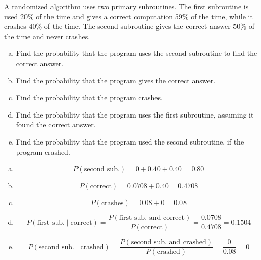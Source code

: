 \documentclass[11pt,letterpaper]{article}
\begin{document}
\newpage



 A randomized algorithm uses two primary subroutines. The first subroutine is used 20\% of the time and gives a correct computation 59\% of the time, while it crashes 40\% of the time. The second subroutine gives the correct answer 50\% of the time and never crashes.
        \begin{enumerate}[(a)]
        \item Find the probability that the program uses the second subroutine to find the correct answer.
        \item Find the probability that the program gives the correct answer.
        \item Find the probability that the program crashes. 
        \item Find the probability that the program uses the first subroutine, assuming it found the correct answer.
        \item Find the probability that the program used the second subroutine, if the program crashed. 
        \end{enumerate} \pspace

\sol 
\begin{enumerate}[(a)]
\item 
	\[
	P(\text{second sub.})= 0 + 0.40 + 0.40= 0.80
	\] 

\item 
	\[
	P(\text{correct})= 0.0708 + 0.40= 0.4708
	\] 

\item 
	\[
	P(\text{crashes})= 0.08 + 0= 0.08
	\] 

\item 
	\[
	P(\text{first sub.} \mid \text{correct})= \dfrac{P(\text{first sub. and correct})}{P(\text{correct})}= \dfrac{0.0708}{0.4708}= 0.1504
	\] \pspace

\item 
	\[
	P(\text{second sub.} \mid \text{crashed})= \dfrac{P(\text{second sub. and crashed})}{P(\text{crashed})}= \dfrac{0}{0.08}= 0
	\] \pspace
\end{enumerate} \vfill
\end{document}
